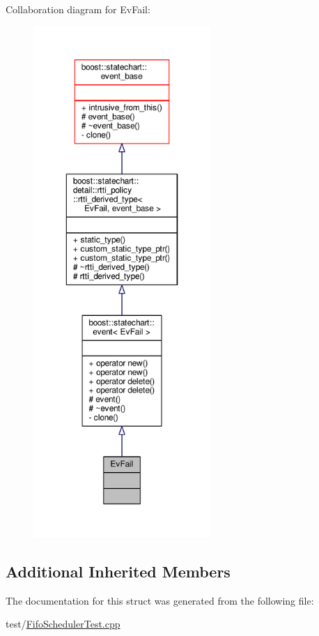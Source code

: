 Collaboration diagram for Ev\+Fail\+:
\nopagebreak
\begin{figure}[H]
\begin{center}
\leavevmode
\includegraphics[height=550pt]{struct_ev_fail__coll__graph}
\end{center}
\end{figure}
\subsection*{Additional Inherited Members}


The documentation for this struct was generated from the following file\+:\begin{DoxyCompactItemize}
\item 
test/\mbox{\hyperlink{_fifo_scheduler_test_8cpp}{Fifo\+Scheduler\+Test.\+cpp}}\end{DoxyCompactItemize}
